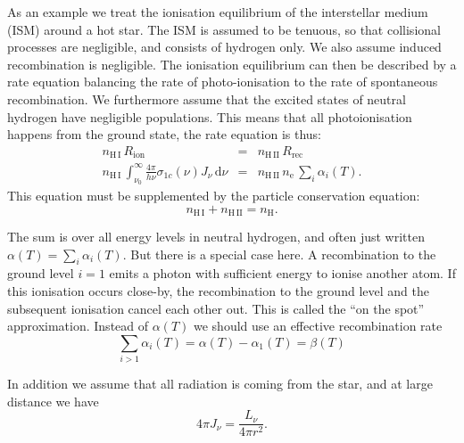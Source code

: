 \documentclass[12pt]{article}
\numberwithin{equation}{section}
\def\dd{\mathrm{d}}
\def\Jnu{\ensuremath{J_{\nu}}}
\newcommand{\be}{\begin{equation}}
\newcommand{\ee}{\end{equation}}
\newcommand{\bea}{\begin{eqnarray}}
\newcommand{\eea}{\end{eqnarray}}
\def\nHI{\ensuremath{n_\mathrm{H \, I}}}
\def\nHII{\ensuremath{n_\mathrm{H\, II}}}
\begin{document}
As an example we treat the ionisation equilibrium of the interstellar medium (ISM) around a hot star. The ISM is assumed to be tenuous, so that collisional processes are negligible, and consists of hydrogen only. We also assume induced recombination is negligible. The ionisation equilibrium can then be described by a rate equation balancing the rate of photo-ionisation to the rate of spontaneous recombination. We furthermore assume that the excited states of neutral hydrogen have negligible populations. This means that all photoionisation happens from the ground state, the rate equation is thus:
\bea
\nHI\, R_\mathrm{ion}  &=&  \nHII \, R_\mathrm{rec} \\
\nHI\,  \int_{\nu_0}^\infty \frac{4 \pi}{h \nu} \sigma_{1c}(\nu) \Jnu \, \dd \nu & = &
\nHII\, n_\mathrm{e} \, \sum_i \alpha_i(T).
\eea
This equation must be supplemented by the particle conservation equation:
\be
\nHI + \nHII = n_\mathrm{H}.
\ee

The sum is over all energy levels in neutral hydrogen, and often just written $\alpha(T) =\sum_i \alpha_i(T)$. But there is a special case here. A recombination to the ground level $i=1$ emits a photon with sufficient energy to ionise another atom. If this ionisation occurs close-by, the recombination to the ground level and the subsequent ionisation cancel each other out. This is called the ``on the spot'' approximation. Instead of $\alpha(T)$ we should use an effective recombination rate 
\be
\sum_{i>1} \alpha_i(T) = \alpha(T)-\alpha_1(T)  = \beta(T)
\ee

In addition we assume that all radiation is coming from the star, and at large distance we have
\be
4 \pi \Jnu = \frac{L_\nu}{4 \pi r^2}.
\ee
\end{document}
